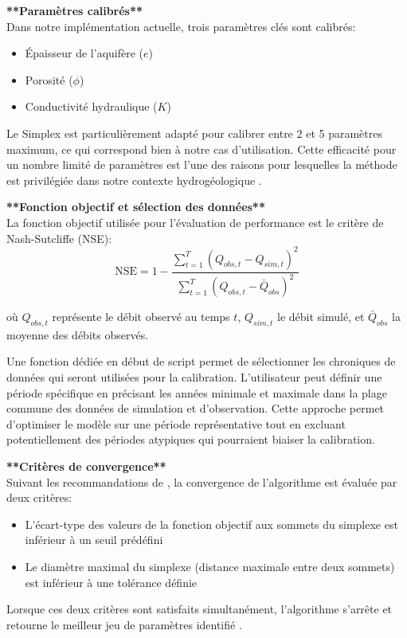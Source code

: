 \vspace{2em}
\noindent\textbf{**Paramètres calibrés**}\\

Dans notre implémentation actuelle, trois paramètres clés sont calibrés:
\begin{itemize}
\item Épaisseur de l'aquifère ($e$)
\item Porosité ($\phi$)
\item Conductivité hydraulique ($K$)
\end{itemize}

Le Simplex est particulièrement adapté pour calibrer entre 2 et 5 paramètres maximum, ce qui correspond bien à notre cas d'utilisation. Cette efficacité pour un nombre limité de paramètres est l'une des raisons pour lesquelles la méthode est privilégiée dans notre contexte hydrogéologique \parencite{gaoImplementingNelderMeadSimplex2012}.

\vspace{2em}
\noindent\textbf{**Fonction objectif et sélection des données**}\\

La fonction objectif utilisée pour l'évaluation de performance est le critère de Nash-Sutcliffe (NSE):
\begin{equation}\label{eq:nse}
\text{NSE} = 1 - \frac{\sum_{t=1}^{T}(Q_{obs,t} - Q_{sim,t})^2}{\sum_{t=1}^{T}(Q_{obs,t} - \bar{Q}_{obs})^2}
\end{equation}

où $Q_{obs,t}$ représente le débit observé au temps $t$, $Q_{sim,t}$ le débit simulé, et $\bar{Q}_{obs}$ la moyenne des débits observés.

Une fonction dédiée en début de script permet de sélectionner les chroniques de données qui seront utilisées pour la calibration. L'utilisateur peut définir une période spécifique en précisant les années minimale et maximale dans la plage commune des données de simulation et d'observation. Cette approche permet d'optimiser le modèle sur une période représentative tout en excluant potentiellement des périodes atypiques qui pourraient biaiser la calibration.

\vspace{2em}
\noindent\textbf{**Critères de convergence**}\\

Suivant les recommandations de \textcite{gaoImplementingNelderMeadSimplex2012}, la convergence de l'algorithme est évaluée par deux critères:
\begin{itemize}
\item L'écart-type des valeurs de la fonction objectif aux sommets du simplexe est inférieur à un seuil prédéfini
\item Le diamètre maximal du simplexe (distance maximale entre deux sommets) est inférieur à une tolérance définie
\end{itemize}

Lorsque ces deux critères sont satisfaits simultanément, l'algorithme s'arrête et retourne le meilleur jeu de paramètres identifié \parencite{gaoImplementingNelderMeadSimplex2012}.
